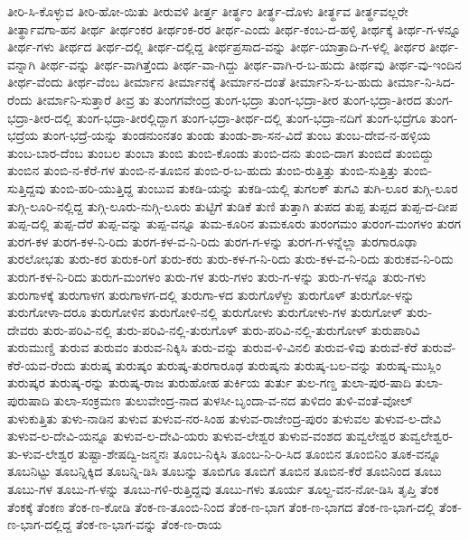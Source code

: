 ತೀರಿ-ಸಿ-ಕೊಳ್ಳುವ
ತೀರಿ-ಹೋ-ಯಿತು
ತೀರುವಳಿ
ತೀರ್ತ್ತ
ತೀರ್ತ್ಥಂ
ತೀರ್ತ್ಥ-ದೊಳು
ತೀರ್ತ್ಥವ
ತೀರ್ತ್ಥವಲ್ಲರೇ
ತೀರ್ತ್ಥಾವಗಾ-ಹನ
ತೀರ್ಥ
ತೀರ್ಥಂಕರ
ತೀರ್ಥಂಕ-ರರ
ತೀರ್ಥ-ಎಂದು
ತೀರ್ಥ-ಕಂಬ-ದ-ಹಳ್ಳಿ
ತೀರ್ಥಕ್ಕೆ
ತೀರ್ಥ-ಗ-ಳನ್ನೂ
ತೀರ್ಥ-ಗಳು
ತೀರ್ಥದ
ತೀರ್ಥ-ದಲ್ಲಿ
ತೀರ್ಥ-ದಲ್ಲಿದ್ದ
ತೀರ್ಥಪ್ರಸಾದ-ವನ್ನು
ತೀರ್ಥ-ಯಾತ್ರಾದಿ-ಗ-ಳಲ್ಲಿ
ತೀರ್ಥರ
ತೀರ್ಥ-ವನ್ನಾಗಿ
ತೀರ್ಥ-ವನ್ನು
ತೀರ್ಥ-ವಾಗಿತ್ತೆಂದು
ತೀರ್ಥ-ವಾ-ಗಿದ್ದು
ತೀರ್ಥ-ವಾಗಿ-ರ-ಬ-ಹುದು
ತೀರ್ಥವು
ತೀರ್ಥ-ವು-ಇಂದಿನ
ತೀರ್ಥ-ವೆಂದು
ತೀರ್ಥ-ವೆಂಬ
ತೀರ್ಮಾನ
ತೀರ್ಮಾನಕ್ಕೆ
ತೀರ್ಮಾನ-ದಂತೆ
ತೀರ್ಮಾನಿ-ಸ-ಬ-ಹುದು
ತೀರ್ಮಾ-ನಿ-ಸಿದ-ರೆಂದು
ತೀರ್ಮಾನಿ-ಸುತ್ತಾರೆ
ತೀವ್ರ
ತು
ತುಂಗಗವೇಂದ್ರ
ತುಂಗ-ಭದ್ರಾ
ತುಂಗ-ಭದ್ರಾ-ತೀರ
ತುಂಗ-ಭದ್ರಾ-ತೀರದ
ತುಂಗ-ಭದ್ರಾ-ತೀರ-ದಲ್ಲಿ
ತುಂಗ-ಭದ್ರಾ-ತೀರಲ್ಲಿದ್ದಾಗ
ತುಂಗ-ಭದ್ರಾ-ತೀರ್ಥ-ದಲ್ಲಿ
ತುಂಗ-ಭದ್ರಾ-ನದಿಗೆ
ತುಂಗ-ಭದ್ರೆಗೂ
ತುಂಗ-ಭದ್ರೆಯ
ತುಂಗ-ಭದ್ರೆ-ಯನ್ನು
ತುಂಡನುಂನತಂ
ತುಂಡು
ತುಂಡು-ಶಾ-ಸನ-ವಿದೆ
ತುಂಬ
ತುಂಬ-ದೇವ-ನ-ಹಳ್ಳಿಯ
ತುಂಬ-ಬಾರ-ದೆಂಬ
ತುಂಬಲ
ತುಂಬಾ
ತುಂಬಿ
ತುಂಬಿ-ಕೊಂಡು
ತುಂಬಿ-ದನು
ತುಂಬಿ-ದಾಗ
ತುಂಬಿದೆ
ತುಂಬಿದ್ದು
ತುಂಬಿನ
ತುಂಬಿ-ನ-ಕೆರೆ-ಗಳ
ತುಂಬಿ-ನ-ತೂಬಿನ
ತುಂಬಿ-ರ-ಬ-ಹುದು
ತುಂಬಿ-ರುತ್ತಿತ್ತು
ತುಂಬಿ-ಸುತ್ತಿತ್ತು
ತುಂಬಿ-ಸುತ್ತಿದ್ದವು
ತುಂಬಿ-ಹರಿ-ಯುತ್ತಿದ್ದ
ತುಂಬುವ
ತುಕಡಿ-ಯನ್ನು
ತುಕಡಿ-ಯಲ್ಲಿ
ತುಗಲಕ್
ತುಗವಿ
ತುಗಿ-ಲೂರ
ತುಗ್ಗಿ-ಲೂರ
ತುಗ್ಗಿ-ಲೂರಿ-ನಲ್ಲಿದ್ದ
ತುಗ್ಗಿ-ಲೂರು-ನುಗ್ಗಿ-ಲೂರು
ತುಟ್ಟಿಗೆ
ತುಡಿಕೆ
ತುಣಿ
ತುತ್ತಾಗಿ
ತುಪದ
ತುಪ್ಪ
ತುಪ್ಪದ
ತುಪ್ಪ-ದ-ದೀಪ
ತುಪ್ಪ-ದಲ್ಲಿ
ತುಪ್ಪ-ದೆರೆ
ತುಪ್ಪ-ವನ್ನು
ತುಪ್ಪ-ವನ್ನೂ
ತುಮ-ಕೂರಿನ
ತುಮಕೂರು
ತುರಂಗಮಂ
ತುರಂಗ-ಮಂಗಳಂ
ತುರಗ
ತುರಗ-ಕಳ
ತುರಗ-ಕಳ-ನಿ-ರಿದು
ತುರಗ-ಕಳ-ವ-ನಿ-ರಿದು
ತುರಗ-ಗ-ಳನ್ನು
ತುರಗ-ಗ-ಳನ್ನೆಲ್ಲಾ
ತುರಗಾರೂಢಾ
ತುರಲೋಭತು
ತುರು-ಕರ
ತುರುಕ-ರಿಗೆ
ತುರು-ಕರು
ತುರು-ಕಳ-ಗ-ನಿ-ರಿದು
ತುರು-ಕಳ-ವ-ನಿ-ರಿದು
ತುರುಕವ-ನಿ-ರಿದು
ತುರುಗ-ಕಳ-ನಿ-ರಿದು
ತುರುಗ-ಮಂಗಳಂ
ತುರು-ಗಳ
ತುರು-ಗಳಂ
ತುರು-ಗ-ಳನ್ನು
ತುರು-ಗ-ಳನ್ನೂ
ತುರು-ಗಳು
ತುರುಗಾಳಕ್ಕೆ
ತುರುಗಾಳಗ
ತುರುಗಾಳಗ-ದಲ್ಲಿ
ತುರುಗಾ-ಳದ
ತುರುಗೊಳೆಳ್ದು
ತುರುಗೊಳ್
ತುರುಗೋ-ಳನ್ನು
ತುರುಗೋಳಾ-ದರೂ
ತುರುಗೋಳಿನ
ತುರುಗೋಳಿ-ನಲ್ಲಿ
ತುರುಗೋಳು
ತುರುಗೋಳು-ಗಳ
ತುರುಗೋಳ್
ತುರು-ದೇವರು
ತುರು-ಪರಿವಿ-ನಲ್ಲಿ
ತುರು-ಪರಿವಿ-ನಲ್ಲಿ-ತುರುಗೊಳ್
ತುರು-ಪರಿವಿ-ನಲ್ಲಿ-ತುರುಗೋಳ್
ತುರುಪಾರಿವಿ
ತುರುಮುಣ್ಡಿ
ತುರುವ
ತುರುವಂ
ತುರುವ-ನಿಕ್ಕಿಸಿ
ತುರು-ವನ್ನು
ತುರುವ-ಳಿ-ವಿನಲಿ
ತುರುವ-ಳಿವು
ತುರುವೆ-ಕೆರೆ
ತುರುವೆ-ಕೆರೆ-ಯವ-ರೆಂದು
ತುರುಷ್ಕ
ತುರುಷ್ಕಂ
ತುರುಷ್ಕ-ತುರಗಾರೂಢ
ತುರುಷ್ಕನು
ತುರುಷ್ಕ-ಬಲ-ವನ್ನು
ತುರುಷ್ಕ-ಮುಸ್ಲಿಂ
ತುರುಷ್ಕರ
ತುರುಷ್ಕ-ರನ್ನು
ತುರುಷ್ಕ-ರಾಜ
ತುರುಹೋಹ
ತುರ್ಕಿಯ
ತುರ್ತು
ತುಲ-ಗಣ್ಡ
ತುಲಾ-ಪುರ-ಷಾದಿ
ತುಲಾ-ಪುರುಷಾದಿ
ತುಲಾ-ಸಂಕ್ರಮಣ
ತುಲುವೇಂದ್ರ-ನಾದ
ತುಳಸೀ-ಬೃಂದಾ-ವ-ನದ
ತುಳಿದಂ
ತುಳಿ-ವಂತೆ-ವೋಲ್
ತುಳುಕುತ್ತಿತು
ತುಳು-ನಾಡಿನ
ತುಳುವ
ತುಳುವ-ನರ-ಸಿಂಹ
ತುಳುವ-ರಾಜೇಂದ್ರ-ಪುರಂ
ತುಳುವಲ
ತುಳುವ-ಲ-ದೇವಿ
ತುಳುವ-ಲ-ದೇವಿ-ಯನ್ನೂ
ತುಳುವ-ಲ-ದೇವಿ-ಯರು
ತುಳುವ-ಲೇಶ್ವರ
ತುಳುವ-ವಂಶದ
ತುವ್ವಲೇಶ್ವರ
ತುವ್ವಲೇಶ್ವರ-ತು-ಳುವ-ಲೇಶ್ವರ
ತುಷ್ಟಾ-ಶೇಷದ್ವಿ-ಜನ್ಮನಃ
ತೂಂಬ-ನಿಕ್ಕಿಸಿ
ತೂಂಬ-ನಿ-ರಿ-ಸಿದ
ತೂಂಬಿನ
ತೂಂಬಿನಿಂ
ತೂಕ-ವನ್ನೂ
ತೂಬನಿಟ್ಟು
ತೂಬನ್ನಿಕ್ಕಿದ
ತೂಬನ್ನಿ-ಡಿಸಿ
ತೂಬನ್ನು
ತೂಬಿಗೂ
ತೂಬಿಗೆ
ತೂಬಿನ
ತೂಬಿನ-ಕೆರೆ
ತೂಬಿನಿಂದ
ತೂಬು
ತೂಬು-ಗಳ
ತೂಬು-ಗ-ಳನ್ನು
ತೂಬು-ಗಳಿ-ರುತ್ತಿದ್ದವು
ತೂಬು-ಗಳು
ತೂರ್ಯ
ತೂಲ್ದ-ವನ-ನೋ-ಡಿಸಿ
ತೃಪ್ತಿ
ತೆಂಕ
ತೆಂಕಕ್ಕೆ
ತೆಂಕಣ
ತೆಂಕ-ಣ-ಕೋಡಿ
ತೆಂಕ-ಣ-ತೂಂಬಿ-ನಿಂದ
ತೆಂಕ-ಣ-ಭಾಗ
ತೆಂಕ-ಣ-ಭಾಗದ
ತೆಂಕ-ಣ-ಭಾಗ-ದಲ್ಲಿ
ತೆಂಕ-ಣ-ಭಾಗ-ದಲ್ಲಿದ್ದ
ತೆಂಕ-ಣ-ಭಾಗ-ವನ್ನು
ತೆಂಕ-ಣ-ರಾಯ
